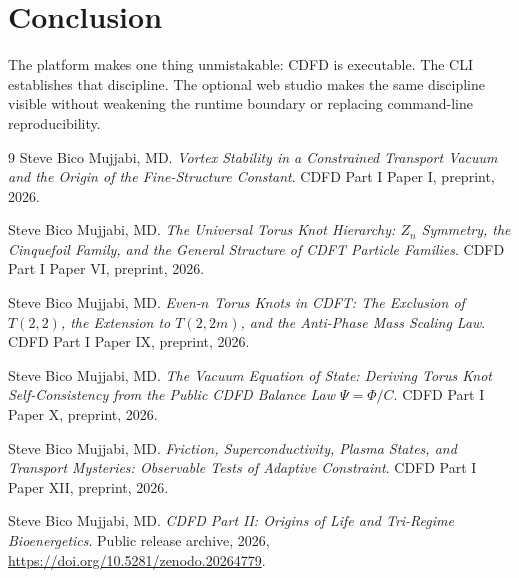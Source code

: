\documentclass[12pt,a4paper]{article}
\begin{document}
\section{Conclusion}
The platform makes one thing unmistakable: CDFD is executable. The CLI
establishes that discipline. The optional web studio makes the same discipline
visible without weakening the runtime boundary or replacing command-line
reproducibility.
\begin{thebibliography}{9}
Steve Bico Mujjabi, MD. \emph{Vortex Stability in a Constrained Transport Vacuum and the Origin of the Fine-Structure Constant}. CDFD Part I Paper I, preprint, 2026.

Steve Bico Mujjabi, MD. \emph{The Universal Torus Knot Hierarchy: $Z_n$ Symmetry, the Cinquefoil Family, and the General Structure of CDFT Particle Families}. CDFD Part I Paper VI, preprint, 2026.

Steve Bico Mujjabi, MD. \emph{Even-$n$ Torus Knots in CDFT: The Exclusion of $T(2,2)$, the Extension to $T(2,2m)$, and the Anti-Phase Mass Scaling Law}. CDFD Part I Paper IX, preprint, 2026.

Steve Bico Mujjabi, MD. \emph{The Vacuum Equation of State: Deriving Torus Knot Self-Consistency from the Public CDFD Balance Law $\Psi = \Phi/C$}. CDFD Part I Paper X, preprint, 2026.

Steve Bico Mujjabi, MD. \emph{Friction, Superconductivity, Plasma States, and Transport Mysteries: Observable Tests of Adaptive Constraint}. CDFD Part I Paper XII, preprint, 2026.

Steve Bico Mujjabi, MD. \emph{CDFD Part II: Origins of Life and Tri-Regime Bioenergetics}. Public release archive, 2026, \url{https://doi.org/10.5281/zenodo.20264779}.
\end{thebibliography}
\end{document}
